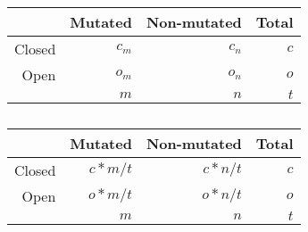 \vspace{0.2cm}
\begin{table}[ht!]
\caption{}
    \begin{subtable}[!h]{.5\textwidth}
        \centering
        \begin{tabular}{r|rr|r}
             & Mutated & Non-mutated & Total  \\
        \hline
            Closed & $c_m$ & $c_n$ & $c$ \\
            Open & $o_m$ & $o_n$ & $o$ \\
        \hline    
             & $m$ & $n$ & $t$ \\
        \end{tabular}
        \vspace{0.2cm}
    \label{tab:count_obs_demo}
    \end{subtable} 
    \quad %
    \begin{subtable}[!h]{.5\textwidth}
        \centering
        \begin{tabular}{r|rr|r}
             & Mutated & Non-mutated & Total  \\
        \hline     
            Closed & $c*m/t$ & $c*n/t$ & $c$ \\
            Open & $o*m/t$ & $o*n/t$ & $o$ \\
        \hline    
             & $m$ & $n$ & $t$ \\
        \end{tabular}
        \vspace{0.2cm}
    \label{tab:count_exp_demo}
    \end{subtable}    
\end{table}
